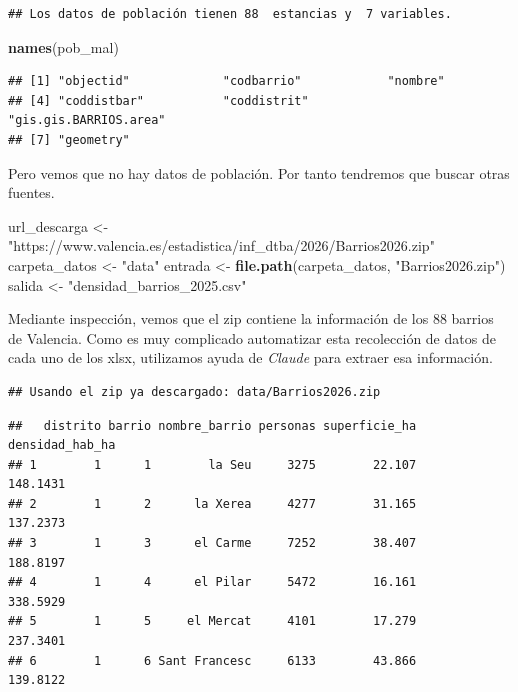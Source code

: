 \documentclass[notspecified,article,submit,moreauthors,pdftex]{Definitions/mdpi}
\newenvironment{Shaded}{\begin{snugshade}}{\end{snugshade}}
\newcommand{\FunctionTok}[1]{\textcolor[rgb]{0.13,0.29,0.53}{\textbf{#1}}}
\newcommand{\NormalTok}[1]{#1}
\newcommand{\OtherTok}[1]{\textcolor[rgb]{0.56,0.35,0.01}{#1}}
\newcommand{\StringTok}[1]{\textcolor[rgb]{0.31,0.60,0.02}{#1}}
\begin{document}
\begin{verbatim}
## Los datos de población tienen 88  estancias y  7 variables.
\end{verbatim}

\begin{Shaded}
\begin{Highlighting}[]
\FunctionTok{names}\NormalTok{(pob\_mal)}
\end{Highlighting}
\end{Shaded}

\begin{verbatim}
## [1] "objectid"             "codbarrio"            "nombre"              
## [4] "coddistbar"           "coddistrit"           "gis.gis.BARRIOS.area"
## [7] "geometry"
\end{verbatim}

Pero vemos que no hay datos de población. Por tanto tendremos que buscar
otras fuentes.

\begin{Shaded}
\begin{Highlighting}[]
\NormalTok{url\_descarga }\OtherTok{\textless{}{-}} \StringTok{"https://www.valencia.es/estadistica/inf\_dtba/2026/Barrios2026.zip"}
\NormalTok{carpeta\_datos }\OtherTok{\textless{}{-}} \StringTok{"data"}
\NormalTok{entrada }\OtherTok{\textless{}{-}} \FunctionTok{file.path}\NormalTok{(carpeta\_datos, }\StringTok{"Barrios2026.zip"}\NormalTok{)}
\NormalTok{salida  }\OtherTok{\textless{}{-}} \StringTok{"densidad\_barrios\_2025.csv"}
\end{Highlighting}
\end{Shaded}

Mediante inspección, vemos que el zip contiene la información de los 88
barrios de Valencia. Como es muy complicado automatizar esta recolección
de datos de cada uno de los xlsx, utilizamos ayuda de \emph{Claude} para
extraer esa información.

\begin{verbatim}
## Usando el zip ya descargado: data/Barrios2026.zip
\end{verbatim}

\begin{verbatim}
##   distrito barrio nombre_barrio personas superficie_ha densidad_hab_ha
## 1        1      1        la Seu     3275        22.107        148.1431
## 2        1      2      la Xerea     4277        31.165        137.2373
## 3        1      3      el Carme     7252        38.407        188.8197
## 4        1      4      el Pilar     5472        16.161        338.5929
## 5        1      5     el Mercat     4101        17.279        237.3401
## 6        1      6 Sant Francesc     6133        43.866        139.8122
\end{verbatim}
\end{document}
